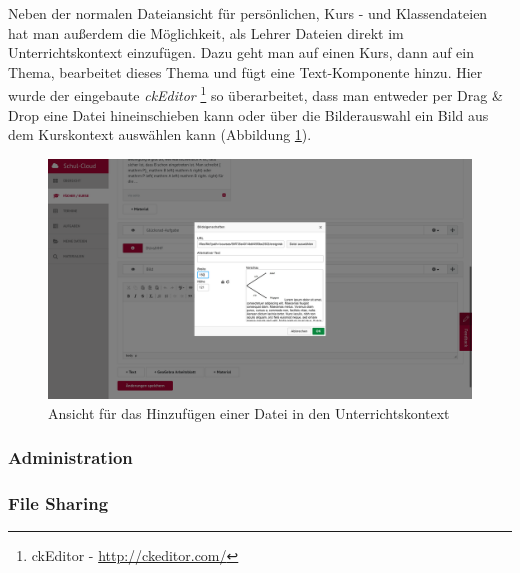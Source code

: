 Neben der normalen Dateiansicht für persönlichen, Kurs - und Klassendateien hat man außerdem die Möglichkeit, als Lehrer Dateien direkt im Unterrichtskontext einzufügen. Dazu geht man auf einen Kurs, dann auf ein Thema, bearbeitet dieses Thema und fügt eine Text-Komponente hinzu. Hier wurde der eingebaute \textit{ckEditor} \footnote{ckEditor - \url{http://ckeditor.com/}} so überarbeitet, dass man entweder per Drag \& Drop eine Datei hineinschieben kann oder über die Bilderauswahl ein Bild aus dem Kurskontext auswählen kann (Abbildung \ref{fig:screenCkEditor}).

\begin{figure}[H]
	\centering
	\includegraphics[width=1\linewidth]{images/screenCkEditor}
	\caption[Caption for implementation]{Ansicht für das Hinzufügen einer Datei in den Unterrichtskontext}
	\label{fig:screenCkEditor}
\end{figure}

\subsubsection{Administration}

\subsubsection{File Sharing}

\clearpage

